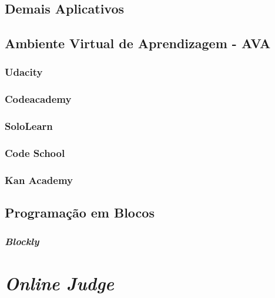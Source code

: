 {\subsection{Demais Aplicativos}

\subsection{Ambiente Virtual de Aprendizagem - AVA}


\subsubsection{Udacity}

\subsubsection{Codeacademy}

\subsubsection{SoloLearn}

\subsubsection{Code School}

\subsubsection{Kan Academy}

\subsection{Programação em Blocos}

\subsubsection{\textit{Blockly}}

\section{\textit{Online Judge}}

}
